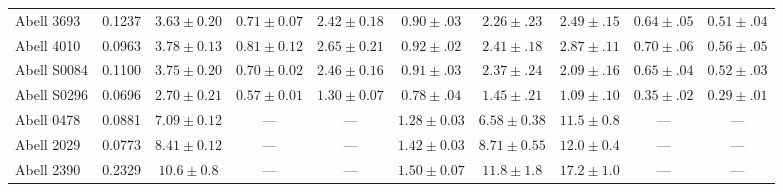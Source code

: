 \begin{tabular}{lccccccccc}
    Abell 3693 & 0.1237 &  $3.63\pm0.20$     & $0.71\pm0.07$ & $ 2.42\pm0.18 $ & $0.90\pm .03$ & $2.26\pm.23$ &  $2.49\pm .15$ & $0.64\pm .05$ & $0.51\pm .04$ \\
    Abell 4010 & 0.0963 &  $3.78\pm0.13$     & $0.81\pm0.12$ & $ 2.65\pm0.21 $ & $0.92\pm .02$ & $2.41\pm.18$ &  $2.87\pm .11$ & $0.70\pm .06$ & $0.56\pm .05$ \\
    Abell S0084& 0.1100 &  $3.75\pm0.20$     & $0.70\pm0.02$ & $ 2.46\pm0.16 $ & $0.91\pm .03$ & $2.37\pm.24$ &  $2.09\pm .16$ & $0.65\pm .04$ & $0.52\pm .03$ \\
    Abell S0296& 0.0696 &  $2.70\pm0.21$     & $0.57\pm0.01$ & $ 1.30\pm0.07 $ & $0.78\pm .04$ & $1.45\pm.21$ &  $1.09\pm .10$ & $0.35\pm .02$ & $0.29\pm .01$ \\
    Abell 0478 & 0.0881 &  $7.09\pm0.12$     &  ---            &  ---             & $1.28\pm 0.03$ & $6.58\pm0.38$ &  $11.5\pm 0.8$ & ---  &  --- \\
    Abell 2029 & 0.0773 &  $8.41\pm0.12$	    &  ---            &  ---             & $1.42\pm 0.03$ & $8.71\pm0.55$ &  $12.0\pm 0.4$ & --- &   --- \\
    Abell 2390 & 0.2329 &  $10.6\pm0.8$	    &  ---            &  ---             & $1.50\pm 0.07$ & $11.8\pm1.8$ &  $17.2\pm 1.0$ & --- &   --- \\
\end{tabular}